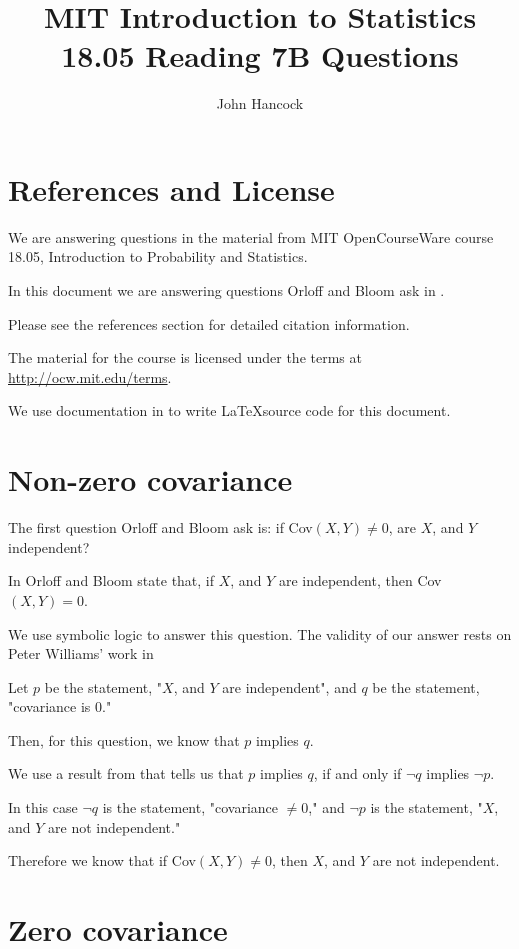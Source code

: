 \documentclass[a4paper,11pt]{article}
\author{John Hancock}
\title{MIT Introduction to Statistics 18.05 Reading 7B Questions}
\begin{document}
\maketitle
\tableofcontents
\section{References and License}
We are answering questions in the material from MIT OpenCourseWare
course 18.05, Introduction to Probability and Statistics.

In this document we are answering questions Orloff and Bloom ask in
\cite{reading7qub}.

Please see the references section for detailed citation information.

The material for the course is licensed under the terms at
\url{http://ocw.mit.edu/terms}.

We use documentation in  \cite{logicNot} to write \LaTeX source code for this
document.

\section{Non-zero covariance}
The first question Orloff and Bloom ask is: if Cov$\left(X, Y \right)\neq 0$,
are $X$, and $Y$ independent?

In \cite{reading7b} Orloff and Bloom state that, if $X$, and $Y$ are
independent, then Cov$\left(X, Y \right)=0$.

We use symbolic logic to answer this question.  The validity of our answer
rests on Peter Williams' work in \cite{symbolicLog}

Let $p$ be the statement, "$X$, and $Y$ are independent", and $q$ be the
statement, "covariance is $0$."

Then, for this question, we know that $p$ implies $q$.

We use a result from \cite{contrapositive} that tells us that $p$ implies
$q$, if and only if $\neg q$ implies $\neg p$.

In this case $\neg q$ is the statement, "covariance $\neq 0$," and $\neg p$ is
the statement, "$X$, and $Y$ are not independent."

Therefore we know that if Cov$\left( X, Y \right) \neq 0$, then $X$, and $Y$
are not independent.

\section{Zero covariance}
\end{document}
